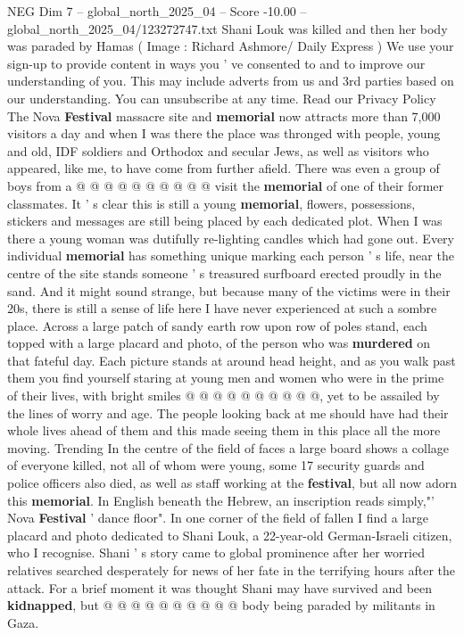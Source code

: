 \begin{textsample}{NEG Dim 7 – global\_north\_2025\_04 – Score -10.00 – global\_north\_2025\_04/123272747.txt}
Shani Louk was killed and then her body was paraded by Hamas ( Image : Richard Ashmore/ Daily Express ) We use your sign-up to provide content in ways you ' ve consented to and to improve our understanding of you.
This may include adverts from us and 3rd parties based on our understanding.
You can unsubscribe at any time.
Read our Privacy Policy The Nova \textbf{Festival} massacre site and \textbf{memorial} now attracts more than 7,000 visitors a day and when I was there the place was thronged with people, young and old, IDF soldiers and Orthodox and secular Jews, as well as visitors who appeared, like me, to have come from further afield.
There was even a group of boys from a @ @ @ @ @ @ @ @ @ @ visit the \textbf{memorial} of one of their former classmates.
It ' s clear this is still a young \textbf{memorial}, flowers, possessions, stickers and messages are still being placed by each dedicated plot.
When I was there a young woman was dutifully re-lighting candles which had gone out.
Every individual \textbf{memorial} has something unique marking each person ' s life, near the centre of the site stands someone ' s treasured surfboard erected proudly in the sand.
And it might sound strange, but because many of the victims were in their 20s, there is still a sense of life here I have never experienced at such a sombre place.
Across a large patch of sandy earth row upon row of poles stand, each topped with a large placard and photo, of the person who was \textbf{murdered} on that fateful day.
Each picture stands at around head height, and as you walk past them you find yourself staring at young men and women who were in the prime of their lives, with bright smiles @ @ @ @ @ @ @ @ @ @, yet to be assailed by the lines of worry and age.
The people looking back at me should have had their whole lives ahead of them and this made seeing them in this place all the more moving.
Trending In the centre of the field of faces a large board shows a collage of everyone killed, not all of whom were young, some 17 security guards and police officers also died, as well as staff working at the \textbf{festival}, but all now adorn this \textbf{memorial}.
In English beneath the Hebrew, an inscription reads simply,"' Nova \textbf{Festival} ' dance floor".
In one corner of the field of fallen I find a large placard and photo dedicated to Shani Louk, a 22-year-old German-Israeli citizen, who I recognise.
Shani ' s story came to global prominence after her worried relatives searched desperately for news of her fate in the terrifying hours after the attack.
For a brief moment it was thought Shani may have survived and been \textbf{kidnapped}, but @ @ @ @ @ @ @ @ @ @ body being paraded by militants in Gaza.

\end{textsample}
